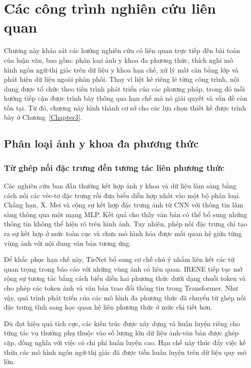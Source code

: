 \chapter{Các công trình nghiên cứu liên quan}
\label{Chapter2}

Chương này khảo sát các hướng nghiên cứu có liên quan trực tiếp đến bài toán của luận văn, bao gồm: phân loại ảnh y khoa đa phương thức, thích nghi mô hình ngôn ngữ-thị giác trên dữ liệu y khoa hạn chế, xử lý mất cân bằng lớp và phát hiện dữ liệu ngoài phân phối. Thay vì liệt kê riêng lẻ từng công trình, nội dung được tổ chức theo tiến trình phát triển của các phương pháp, trong đó mỗi hướng tiếp cận được trình bày thông qua hạn chế mà nó giải quyết và vấn đề còn tồn tại. Từ đó, chương này hình thành cơ sở cho các lựa chọn thiết kế được trình bày ở Chương~\ref{Chapter3}.

\section{Phân loại ảnh y khoa đa phương thức}
\label{sec:related_multimodal}

\subsection{Từ ghép nối đặc trưng đến tương tác liên phương thức}

Các nghiên cứu ban đầu thường kết hợp ảnh y khoa và dữ liệu lâm sàng bằng cách nối các véc-tơ đặc trưng rồi đưa biểu diễn hợp nhất vào một bộ phân loại. Chẳng hạn, X. Mei và cộng sự \cite{XMei} kết hợp đặc trưng ảnh từ CNN với thông tin lâm sàng thông qua một mạng MLP. Kết quả cho thấy văn bản có thể bổ sung những thông tin không thể hiện rõ trên hình ảnh. Tuy nhiên, phép nối đặc trưng chỉ tạo ra sự kết hợp ở mức toàn cục và chưa mô hình hóa được mối quan hệ giữa từng vùng ảnh với nội dung văn bản tương ứng.

Để khắc phục hạn chế này, TieNet \cite{TieNet} bổ sung cơ chế chú ý nhằm liên kết các từ quan trọng trong báo cáo với những vùng ảnh có liên quan. IRENE \cite{IRENE} tiếp tục mở rộng sự tương tác bằng cách biểu diễn hai phương thức dưới dạng chuỗi token và cho phép các token ảnh và văn bản trao đổi thông tin trong Transformer. Như vậy, quá trình phát triển của các mô hình đa phương thức đã chuyển từ ghép nối đặc trưng tĩnh sang học quan hệ liên phương thức ở mức chi tiết hơn.

Dù đạt hiệu quả tích cực, các kiến trúc được xây dựng và huấn luyện riêng cho từng tác vụ thường phụ thuộc vào số lượng lớn dữ liệu ảnh-văn bản được ghép cặp, đồng nghĩa với việc có chi phí huấn luyện cao. Hạn chế này thúc đẩy việc kế thừa các mô hình ngôn ngữ-thị giác đã được tiền huấn luyện trên dữ liệu quy mô lớn.

